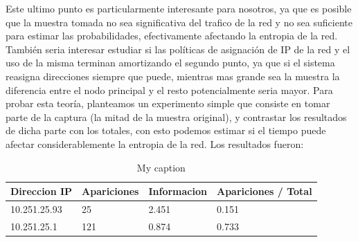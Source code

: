 Este ultimo punto es particularmente interesante para nosotros, ya que es posible que la muestra tomada no sea significativa del trafico de la red y no sea suficiente para estimar las probabilidades, efectivamente afectando la entropia de la red. También seria interesar estudiar si las políticas de asignación de IP de la red y el uso de la misma terminan amortizando el segundo punto, ya que si el sistema reasigna direcciones siempre que puede, mientras mas grande sea la muestra la diferencia entre el nodo principal y el resto potencialmente seria mayor. Para probar esta teoría, planteamos un experimento simple que consiste en tomar parte de la captura (la mitad de la muestra original), y contrastar los resultados de dicha parte con los totales, con esto podemos estimar si el tiempo puede afectar considerablemente la entropia de la red. Los resultados fueron:


\begin{table}[H]
\centering
\caption{My caption}
\label{my-label}
\begin{tabular}{@{}llll@{}}
\toprule
Direccion IP & Apariciones & Informacion & Apariciones / Total \\ \midrule
10.251.25.93 & 25          & 2.451       & 0.151               \\
10.251.25.1  & 121         & 0.874       & 0.733               \\ \bottomrule
\end{tabular}
\end{table}


